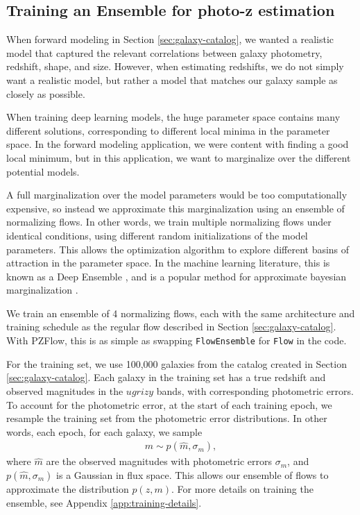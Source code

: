 \documentclass[twocolumn,twocolappendix]{aastex631}
\begin{document}
\subsection{Training an Ensemble for photo-z estimation}

When forward modeling in Section \ref{sec:galaxy-catalog}, we wanted a realistic model that captured the relevant correlations between galaxy photometry, redshift, shape, and size.
However, when estimating redshifts, we do not simply want a realistic model, but rather a model that matches our galaxy sample as closely as possible.

When training deep learning models, the huge parameter space contains many different solutions, corresponding to different local minima in the parameter space.
In the forward modeling application, we were content with finding a good local minimum, but in this application, we want to marginalize over the different potential models.

A full marginalization over the model parameters would be too computationally expensive, so instead we approximate this marginalization using an ensemble of normalizing flows.
In other words, we train multiple normalizing flows under identical conditions, using different random initializations of the model parameters.
This allows the optimization algorithm to explore different basins of attraction in the parameter space.
In the machine learning literature, this is known as a Deep Ensemble \citep{lakshminarayanan2017}, and is a popular method for approximate bayesian marginalization \citep{wilson2020,fort2020}.

We train an ensemble of 4 normalizing flows, each with the same architecture and training schedule as the regular flow described in Section \ref{sec:galaxy-catalog}.
With PZFlow, this is as simple as swapping \texttt{FlowEnsemble} for \texttt{Flow} in the code.

For the training set, we use 100,000 galaxies from the catalog created in Section \ref{sec:galaxy-catalog}.
Each galaxy in the training set has a true redshift and observed magnitudes in the $ugrizy$ bands, with corresponding photometric errors.
To account for the photometric error, at the start of each training epoch, we resample the training set from the photometric error distributions.
In other words, each epoch, for each galaxy, we sample
\begin{align}
    m \sim p(\hat{m}, \sigma_m),
\end{align}
where $\hat{m}$ are the observed magnitudes with photometric errors $\sigma_m$, and $p(\hat{m}, \sigma_m)$ is a Gaussian in flux space.
This allows our ensemble of flows to approximate the distribution $p(z, m)$.
For more details on training the ensemble, see Appendix \ref{app:training-details}.
\end{document}
